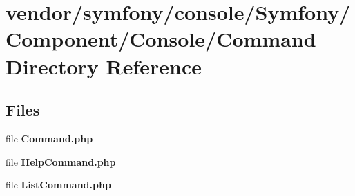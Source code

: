 \section{vendor/symfony/console/\+Symfony/\+Component/\+Console/\+Command Directory Reference}
\label{dir_395d3e748d2d87e3ecd5c0214d1ab59c}
\subsection*{Files}
\begin{DoxyCompactItemize}
\item 
file {\bf Command.\+php}
\item 
file {\bf Help\+Command.\+php}
\item 
file {\bf List\+Command.\+php}
\end{DoxyCompactItemize}
